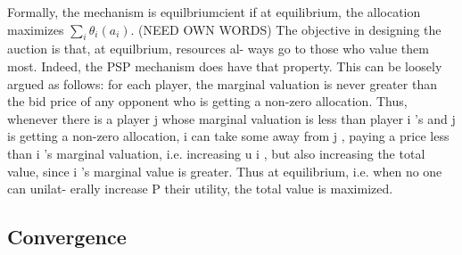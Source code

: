 \documentclass[12pt]{article}
\theoremstyle{definition}
\begin{document}
\begin{multicols}{2}
Formally, the
mechanism is equilbriumcient if at equilibrium, the allocation maximizes
$\sum_i\theta_i(a_i)$.
(NEED OWN WORDS)
The objective in designing the auction is that, at equilbrium, resources al-
ways go to those who value them most. Indeed, the PSP mechanism does
have that property. This can be loosely argued as follows: for each player,
the marginal valuation is never greater than the bid price of any opponent
who is getting a non-zero allocation. Thus, whenever there is a player j
whose marginal valuation is less than player i 's and j is getting a non-zero
allocation, i can take some away from j , paying a price less than i 's marginal
valuation, i.e. increasing u i , but also increasing the total value, since i 's
marginal value is greater. Thus at equilibrium, i.e. when no one can unilat-
erally increase P their utility, the total value is maximized.

\subsection{Convergence}

\end{multicols}
\end{document}
